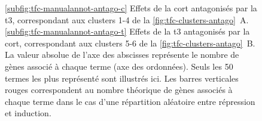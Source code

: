 \begin{figure}[!htbp]
{\ref{subfig:tfc-manualannot-antago-c} Effets de la \gls{cort} antagonisés par la \gls{t3}, correspondant aux clusters 1-4 de la \autoref{fig:tfc-clusters-antago}~A.
\ref{subfig:tfc-manualannot-antago-t} Effets de la \gls{t3} antagonisés par la \gls{cort}, correspondant aux clusters 5-6 de la \autoref{fig:tfc-clusters-antago}~B.
La valeur absolue de l'axe des abscisses représente le nombre de gènes associé à chaque terme (axe des ordonnées).
Seuls les 50 termes les plus représenté sont illustrés ici.
Les barres verticales rouges correspondent au nombre théorique de gènes associés à chaque terme dans le cas d'une répartition aléatoire entre répression et induction.
}
\label{fig:tfc-manualannot-antago}
%
\end{figure}

